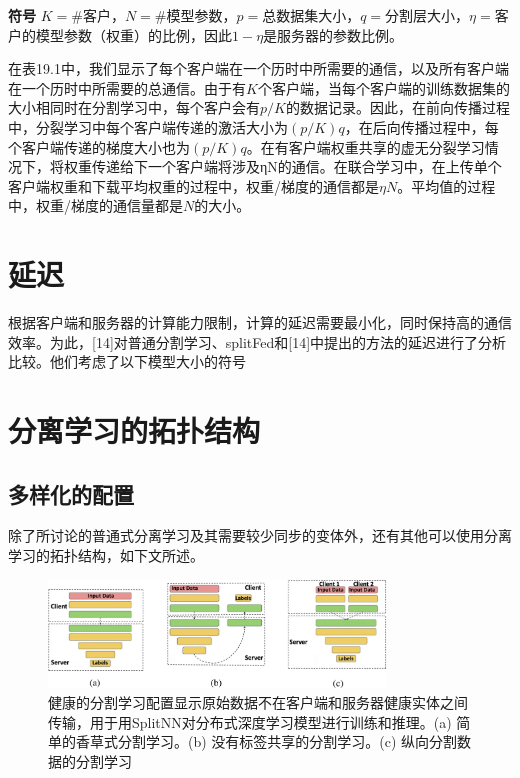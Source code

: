 \textbf{符号} $K=\#$客户，$N=\#$模型参数，$p=$总数据集大小，$q=$分割层大小，$\eta=$客户的模型参数（权重）的比例，因此$1-\eta$是服务器的参数比例。

在表19.1中，我们显示了每个客户端在一个历时中所需要的通信，以及所有客户端在一个历时中所需要的总通信。由于有$K$个客户端，当每个客户端的训练数据集的大小相同时在分割学习中，每个客户会有$p/K$的数据记录。因此，在前向传播过程中，分裂学习中每个客户端传递的激活大小为$(p/K)q$，在后向传播过程中，每个客户端传递的梯度大小也为$(p/K)q$。在有客户端权重共享的虚无分裂学习情况下，将权重传递给下一个客户端将涉及ηN的通信。在联合学习中，在上传单个客户端权重和下载平均权重的过程中，权重/梯度的通信都是$\eta N$。平均值的过程中，权重/梯度的通信量都是$N$的大小。

\section{延迟}
根据客户端和服务器的计算能力限制，计算的延迟需要最小化，同时保持高的通信效率。为此，[14]对普通分割学习、splitFed和[14]中提出的方法的延迟进行了分析比较。他们考虑了以下模型大小的符号

\section{分离学习的拓扑结构}
\subsection{多样化的配置}
除了所讨论的普通式分离学习及其需要较少同步的变体外，还有其他可以使用分离学习的拓扑结构，如下文所述。
\begin{figure}
	\centering
	\includegraphics[width=0.8\textwidth]{chapter19/images/Fig.19.2}
	\caption{健康的分割学习配置显示原始数据不在客户端和服务器健康实体之间传输，用于用SplitNN对分布式深度学习模型进行训练和推理。(a) 简单的香草式分割学习。(b) 没有标签共享的分割学习。(c) 纵向分割数据的分割学习} \label{fig:19.2}
\end{figure}

